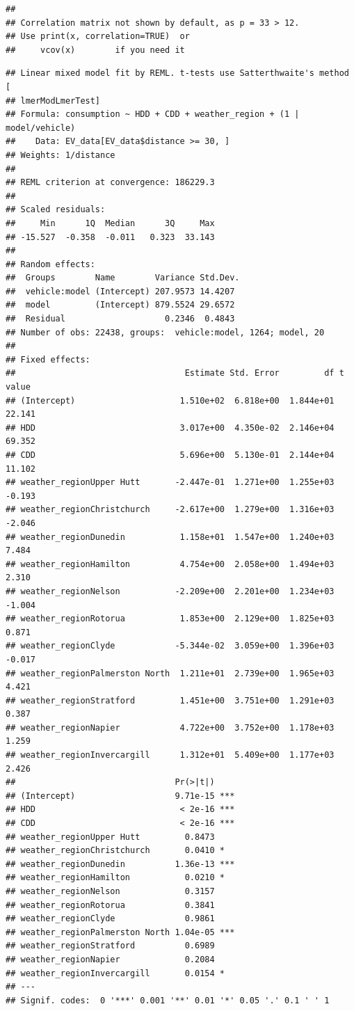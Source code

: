 \documentclass[
]{article}
\begin{document}
\begin{verbatim}
## 
## Correlation matrix not shown by default, as p = 33 > 12.
## Use print(x, correlation=TRUE)  or
##     vcov(x)        if you need it
\end{verbatim}

\begin{verbatim}
## Linear mixed model fit by REML. t-tests use Satterthwaite's method [
## lmerModLmerTest]
## Formula: consumption ~ HDD + CDD + weather_region + (1 | model/vehicle)
##    Data: EV_data[EV_data$distance >= 30, ]
## Weights: 1/distance
## 
## REML criterion at convergence: 186229.3
## 
## Scaled residuals: 
##     Min      1Q  Median      3Q     Max 
## -15.527  -0.358  -0.011   0.323  33.143 
## 
## Random effects:
##  Groups        Name        Variance Std.Dev.
##  vehicle:model (Intercept) 207.9573 14.4207 
##  model         (Intercept) 879.5524 29.6572 
##  Residual                    0.2346  0.4843 
## Number of obs: 22438, groups:  vehicle:model, 1264; model, 20
## 
## Fixed effects:
##                                  Estimate Std. Error         df t value
## (Intercept)                     1.510e+02  6.818e+00  1.844e+01  22.141
## HDD                             3.017e+00  4.350e-02  2.146e+04  69.352
## CDD                             5.696e+00  5.130e-01  2.144e+04  11.102
## weather_regionUpper Hutt       -2.447e-01  1.271e+00  1.255e+03  -0.193
## weather_regionChristchurch     -2.617e+00  1.279e+00  1.316e+03  -2.046
## weather_regionDunedin           1.158e+01  1.547e+00  1.240e+03   7.484
## weather_regionHamilton          4.754e+00  2.058e+00  1.494e+03   2.310
## weather_regionNelson           -2.209e+00  2.201e+00  1.234e+03  -1.004
## weather_regionRotorua           1.853e+00  2.129e+00  1.825e+03   0.871
## weather_regionClyde            -5.344e-02  3.059e+00  1.396e+03  -0.017
## weather_regionPalmerston North  1.211e+01  2.739e+00  1.965e+03   4.421
## weather_regionStratford         1.451e+00  3.751e+00  1.291e+03   0.387
## weather_regionNapier            4.722e+00  3.752e+00  1.178e+03   1.259
## weather_regionInvercargill      1.312e+01  5.409e+00  1.177e+03   2.426
##                                Pr(>|t|)    
## (Intercept)                    9.71e-15 ***
## HDD                             < 2e-16 ***
## CDD                             < 2e-16 ***
## weather_regionUpper Hutt         0.8473    
## weather_regionChristchurch       0.0410 *  
## weather_regionDunedin          1.36e-13 ***
## weather_regionHamilton           0.0210 *  
## weather_regionNelson             0.3157    
## weather_regionRotorua            0.3841    
## weather_regionClyde              0.9861    
## weather_regionPalmerston North 1.04e-05 ***
## weather_regionStratford          0.6989    
## weather_regionNapier             0.2084    
## weather_regionInvercargill       0.0154 *  
## ---
## Signif. codes:  0 '***' 0.001 '**' 0.01 '*' 0.05 '.' 0.1 ' ' 1
\end{verbatim}
\end{document}

